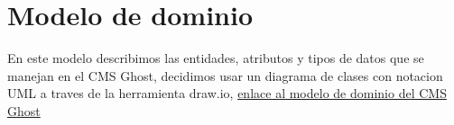 \documentclass[report,12pt]{article}
\begin{document}
\section{Modelo de dominio}
En este modelo describimos las entidades, atributos y  tipos de datos que se manejan en  el CMS Ghost, decidimos usar un diagrama de clases con notacion UML a traves de la herramienta draw.io, \href{https://drive.google.com/file/d/1AeHiRqBHY_PK6NRBMy1sDqH8jC6v0vbe/view?usp=sharing}{enlace al modelo de dominio del CMS Ghost}
\end{document}
